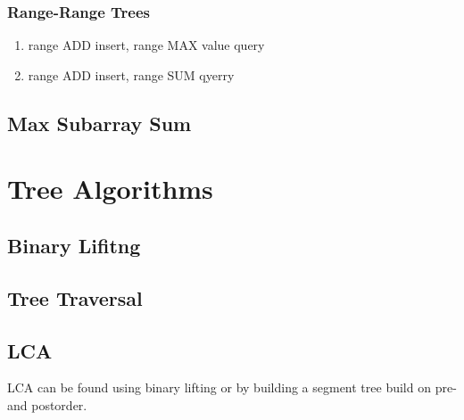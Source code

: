 \documentclass[13pt]{article}
\begin{document}
\subsubsection{Range-Range Trees}
\begin{enumerate}
	\item range ADD insert, range MAX value query
	      
	      
	\item range ADD insert, range SUM qyerry
	      
	      
\end{enumerate}



\subsection{Max Subarray Sum}\label{sub:max_subarray_sum} %


\section{Tree Algorithms}

\subsection{Binary Lifitng}\label{sub:binary_lifitng} %


\subsection{Tree Traversal}\label{sub:tree_traversal} %


\subsection{LCA}\label{sub:lca} %
LCA can be found using binary lifting or by building a segment tree build on pre- and postorder.
\end{document}
